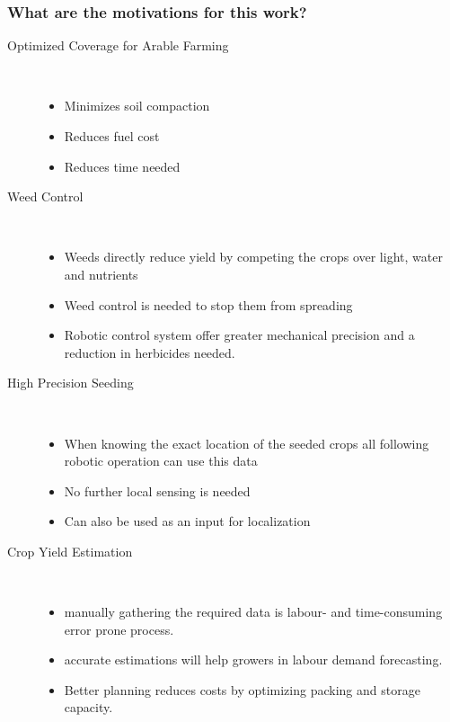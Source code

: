      
    
    \subsubsection*{What are the motivations for this work?}
    \begin{description}
    
        \item[Optimized Coverage for Arable Farming] \
        \begin{itemize}
            \item Minimizes soil compaction
            \item Reduces fuel cost
            \item Reduces time needed
        \end{itemize}
        \item[Weed Control] \
        \begin{itemize}
            \item Weeds directly reduce yield by competing the crops over light, water and nutrients
            \item Weed control is needed to stop them from spreading
            \item Robotic control system offer greater mechanical precision and a reduction in herbicides needed.
        \end{itemize}
        \item[High Precision Seeding] \
        \begin{itemize}
            \item When knowing the exact location of the seeded crops all following robotic operation can use this data
            \item No further local sensing is needed
            \item Can also be used as an input for localization
        \end{itemize}
        \item[Crop Yield Estimation] \
        \begin{itemize}
            \item manually gathering the required data is labour- and time-consuming error prone process.
            \item accurate estimations will help growers in labour demand forecasting. 
            \item Better planning reduces costs by optimizing packing and storage capacity.
        \end{itemize}

\end{description}
